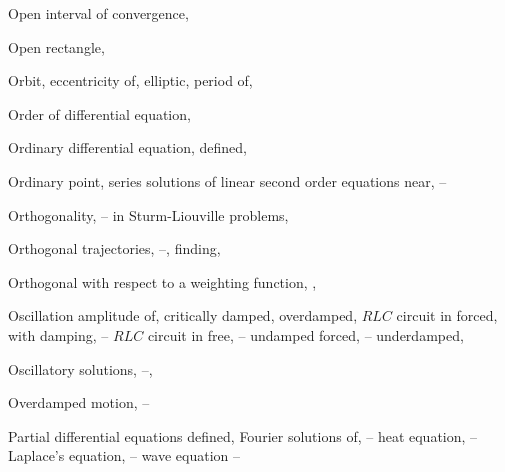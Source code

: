 \begin{theindex}
  \item Open interval of convergence, \pageref{thmtype:7.1.2}

  \item Open rectangle, \pageref{thmtype:2.3.1}

  \item Orbit, \pageref{exer:6.4.1}
    \subitem eccentricity of, \pageref{eq:6.4.11}
    \subitem elliptic, \pageref{eq:6.4.11}
    \subitem period of, \pageref{exer:6.4.1}

  \item Order of differential equation, \pageref{eq:1.2.1}

  \item Ordinary differential equation,
    \subitem defined, \pageref{eq:1.2.1}

  \item Ordinary point, series solutions of linear second order equations near, \pageref{eq:7.2.1}--\pageref{exer:7.3.49}

  \item Orthogonality, \pageref{thmtype:11.1.6}--\pageref{example:11.1.1}
    \subitem in Sturm-Liouville problems, \pageref{thmtype:13.2.4}

  \item Orthogonal trajectories, \pageref{figure:4.5.11}--\pageref{exer:4.5.1},
    \subitem finding, \pageref{example:4.5.9}

  \item Orthogonal with respect to a weighting function, \pageref{exer:7.2.30}, \pageref{exer:7.2.31}

  \item Oscillation
    \subitem amplitude of, \pageref{eq:6.1.10}
    \subitem critically damped, \pageref{eq:6.3.12}
    \subitem overdamped, \pageref{eq:6.3.11}
    \subitem $RLC$ circuit in forced, with damping, \pageref{eq:6.3.17}--\pageref{example:6.3.2}
    \subitem $RLC$ circuit in free, \pageref{eq:6.3.8}--\pageref{eq:6.3.17}
    \subitem undamped forced, \pageref{eq:6.1.13}--\pageref{exer:6.1.1}
    \subitem underdamped, \pageref{eq:6.3.9}

  \item Oscillatory solutions, \pageref{example:5.4.4}--\pageref{exer:4.4.1}, \pageref{exer:7.4.21}

  \item Overdamped motion, \pageref{eq:6.2.1}--\pageref{eq:6.2.3} 

  \item Partial differential equations
    \subitem defined, \pageref{eq:1.2.1}
    \subitem Fourier solutions of, \pageref{eq:12.1.1}--\pageref{exer:12.4.7}
      \subsubitem heat equation, \pageref{eq:12.1.1}--\pageref{eq:12.2.1}
      \subsubitem Laplace's equation, \pageref{eq:12.3.1}--\pageref{exer:12.4.7}
      \subsubitem wave equation \pageref{eq:12.2.1}--\pageref{exer:12.2.68}


\end{theindex}
